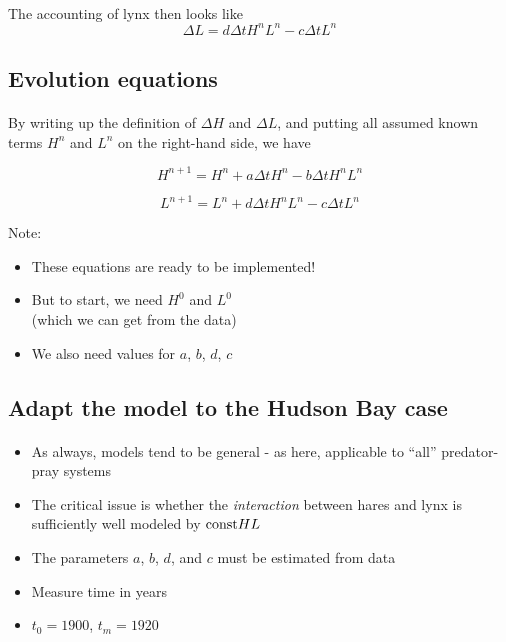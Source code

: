 \documentclass[%
oneside,                 %
final,                   %
10pt]{article}
\begin{document}
\paragraph{}
The accounting of lynx then looks like
\[ \Delta L = d\Delta t H^nL^n - c\Delta t L^n\]



\subsection{Evolution equations}


\paragraph{}
By writing up the definition of $\Delta H$ and $\Delta L$, and putting
all assumed known terms $H^n$ and $L^n$ on the right-hand side, we have

\[ H^{n+1} = H^n + a\Delta t H^n - b\Delta t H^n L^n \]

\[ L^{n+1} = L^n + d\Delta t H^nL^n - c\Delta t L^n \]

Note:

\begin{itemize}
 \item These equations are ready to be implemented!

 \item But to start, we need $H^0$ and $L^0$ \\
   (which we can get from the data)

 \item We also need values for $a$, $b$, $d$, $c$
\end{itemize}

\noindent



\subsection{Adapt the model to the Hudson Bay case}


\paragraph{}
\begin{itemize}
 \item As always, models tend to be general - as here, applicable
   to ``all'' predator-pray systems

 \item The critical issue is whether the \emph{interaction} between hares and lynx
   is sufficiently well modeled by $\hbox{const}HL$

 \item The parameters $a$, $b$, $d$, and $c$ must be
   estimated from data

 \item Measure time in years

 \item $t_0=1900$, $t_m=1920$
\end{itemize}
\end{document}
